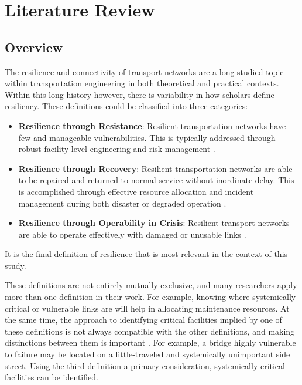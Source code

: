 \chapter{Literature Review}
\label{chp:chapter2}
\graphicspath{{figures/}{figures/chapter2/}}

\section{Overview}
\label{sec:ch2overview}

The resilience and connectivity of transport networks are a long-studied
topic within
transportation engineering in both theoretical and practical contexts.
Within this long history
however, there is variability in how scholars define resiliency. These definitions
could be classified into three categories:
\begin{itemize}
	\item \textbf {Resilience through Resistance}: Resilient transportation networks
	have few and manageable vulnerabilities. This is typically addressed
	through robust facility-level engineering and risk management
	\citep{bradley2007, peeta2010}.
	\item \textbf{Resilience through Recovery}: Resilient transportation networks are
	able to be repaired and returned to normal service without inordinate
	delay. This is accomplished through effective resource allocation and
	incident management during both disaster or degraded operation
	\citep{zhang2016}.
	\item \textbf{Resilience through Operability in Crisis}: Resilient transport
	networks are able to operate effectively with damaged or unusable links
	\citep{berdica2002, ip2011}.
\end{itemize}
It is the final definition of resilience that is most relevant in the context of this study.

These definitions are not entirely mutually exclusive, and many
researchers apply more than one
definition in their work. For example, knowing where systemically critical
or vulnerable links
are will help in allocating maintenance resources. At the same time, the
approach to identifying
critical facilities implied by one of these definitions is not always
compatible with the other
definitions, and making distinctions between them is important
\citep{rogers2012}. For example, a bridge
highly vulnerable to failure may be located on a little-traveled and
systemically unimportant
side street. Using the third definition a primary consideration, systemically critical
facilities can be identified.

